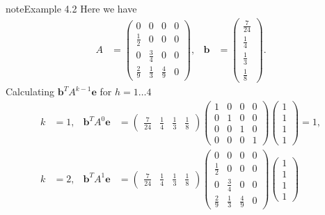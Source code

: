 \documentclass[letterpaper,10pt,english]{jupyterBook}
\begin{document}
\begin{sphinxadmonition}{note}{Example 4.2}
\sphinxAtStartPar
Here we have
\begin{align*}
    A &= \begin{pmatrix}
        0 & 0 & 0 & 0 \\
        \frac{1}{2} & 0 & 0 & 0 \\
        0 & \frac{3}{4} & 0 & 0 \\
        \frac{2}{9} & \frac{1}{3} & \frac{4}{9} & 0
    \end{pmatrix}, &
    \mathbf{b} &= \begin{pmatrix} \frac{7}{24} \\ \frac{1}{4} \\ \frac{1}{3} \\ \frac{1}{8} \end{pmatrix}.
\end{align*}
\sphinxAtStartPar
Calculating \(\mathbf{b}^TA^{k - 1}\mathbf{e}\) for \(h = 1 \ldots 4\)
\begin{align*}
    k &= 1, & \mathbf{b}^TA^0 \mathbf{e} &= 
    \begin{pmatrix} \frac{7}{24} & \frac{1}{4} & \frac{1}{3} & \frac{1}{8} \end{pmatrix}
    \begin{pmatrix} 
        1 & 0 & 0 & 0 \\
        0 & 1 & 0 & 0 \\
        0 & 0 & 1 & 0 \\
        0 & 0 & 0 & 1 
    \end{pmatrix}
    \begin{pmatrix} 1 \\ 1 \\ 1 \\ 1 \end{pmatrix} = 1, \\
    k &= 2, & \mathbf{b}^TA^1 \mathbf{e} &= 
    \begin{pmatrix} \frac{7}{24} & \frac{1}{4} & \frac{1}{3} & \frac{1}{8} \end{pmatrix}
    \begin{pmatrix}
        0 & 0 & 0 & 0 \\
        \frac{1}{2} & 0 & 0 & 0 \\
        0 & \frac{3}{4} & 0 & 0 \\
        \frac{2}{9} & \frac{1}{3} & \frac{4}{9} & 0
    \end{pmatrix}
    \begin{pmatrix} 1 \\ 1 \\ 1 \\ 1 \end{pmatrix} 

\end{align*}
\end{sphinxadmonition}
\end{document}
